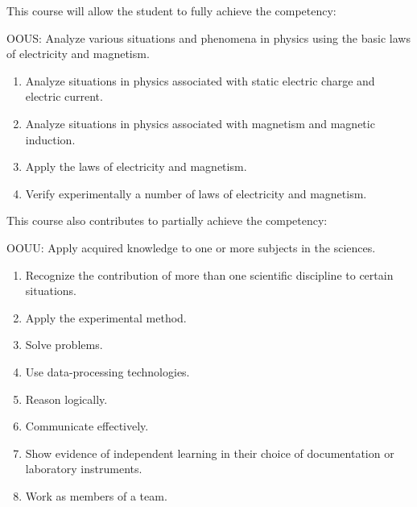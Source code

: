 {This course will allow the student to fully achieve the competency:

OOUS: Analyze various situations and phenomena in physics using the basic laws of electricity and magnetism.
\begin{enumerate}
\item Analyze situations in physics associated with static electric charge and electric current.
\item Analyze situations in physics associated with magnetism and magnetic induction.
\item Apply the laws of electricity and magnetism.
\item Verify experimentally a number of laws of electricity and magnetism.
\end{enumerate}
\smallskip
This course also contributes to partially achieve the competency:

OOUU:	Apply acquired knowledge to one or more subjects in the sciences.
\begin{enumerate}
\item Recognize the contribution of more than one scientific discipline to certain situations.
\item Apply the experimental method.
\item Solve problems.
\item Use data-processing technologies.
\item Reason logically.
\item Communicate effectively.
\item Show evidence of independent learning in their choice of documentation or laboratory instruments.
\item Work as members of a team.
\end{enumerate}
}
